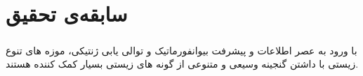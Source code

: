 
\chapter{سابقه‌ی تحقیق} \label{chapter:related-works}

\paragraph*{}

با ورود به عصر اطلاعات و پیشرفت بیوانفورماتیک و توالی یابی ژنتیکی، موزه های تنوع زیستی با داشتن گنجینه وسیعی و متنوعی از گونه های زیستی بسیار کمک کننده هستند.
